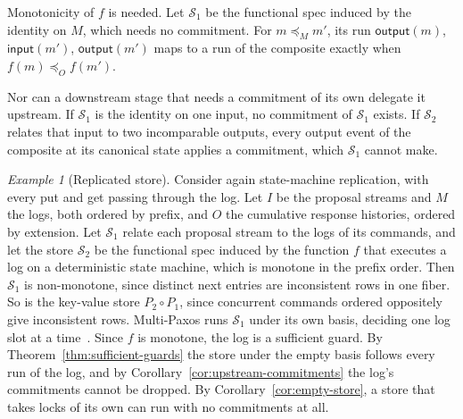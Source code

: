 \documentclass[sigconf]{cidr-2027}
\theoremstyle{remark}
\newtheorem{example}{Example}
\newcommand{\OutputOrd}{\preceq_O}
\newcommand{\commitment}{commitment\xspace}
\newcommand{\commitments}{commitments\xspace}
\newcommand{\Spec}{\mathcal{S}}
\begin{document}
Monotonicity of $f$ is needed. Let $\Spec_1$ be the functional spec induced
by the identity on $M$, which needs no \commitment. For $m\preceq_M m'$, its
run $\mathsf{output}(m)$, $\mathsf{input}(m')$, $\mathsf{output}(m')$ maps to
a run of the composite exactly when $f(m)\OutputOrd f(m')$.

Nor can a downstream stage that needs a \commitment of its own delegate it
upstream. If $\Spec_1$ is the identity on one input, no \commitment of
$\Spec_1$ exists. If $\Spec_2$ relates that input to two incomparable
outputs, every output event of the composite at its canonical state applies a
\commitment, which $\Spec_1$ cannot make.

\begin{example}[Replicated store]
\label{ex:committed-log-composition}
Consider again state-machine replication, with every put and get passing
through the log. Let $I$ be the proposal streams and $M$ the logs, both
ordered by prefix, and $O$ the cumulative response histories, ordered by
extension. Let $\Spec_1$ relate each proposal stream to the logs of its
commands, and let the store $\Spec_2$ be the functional spec induced by the
function $f$ that executes a log on a deterministic state machine, which is
monotone in the prefix order. Then $\Spec_1$ is non-monotone, since distinct next entries are inconsistent rows in one fiber. So is the key-value store
$P_2\circ P_1$, since concurrent commands ordered oppositely give inconsistent rows. Multi-Paxos runs $\Spec_1$ under its own basis, deciding one log
slot at a time~\cite{schneider1990smr,lamport2001paxos}. Since $f$ is
monotone, the log is a sufficient guard. By Theorem~\ref{thm:sufficient-guards} the store under the empty basis follows every run of the log, and by Corollary~\ref{cor:upstream-commitments} the log's \commitments cannot be
dropped. By Corollary~\ref{cor:empty-store}, a store that takes locks of its
own can run with no \commitments at all.
\end{example}
\end{document}
